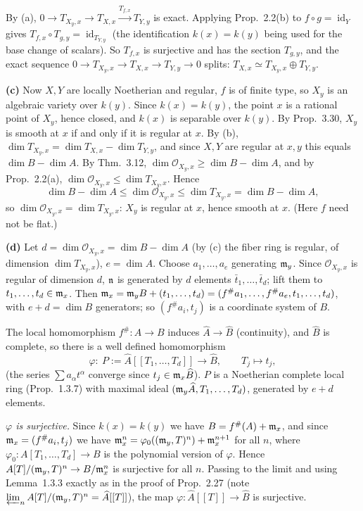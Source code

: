 \documentclass[11pt]{article}
\begin{document}
By (a), $0\to T_{X_y,x}\to T_{X,x}\xrightarrow{T_{f,x}}T_{Y,y}$ is exact. Applying Prop.~2.2(b) to $f\circ g=\operatorname{id}_Y$ gives $T_{f,x}\circ T_{g,y}=\operatorname{id}_{T_{Y,y}}$ (the identification $k(x)=k(y)$ being used for the base change of scalars). So $T_{f,x}$ is surjective and has the section $T_{g,y}$, and the exact sequence $0\to T_{X_y,x}\to T_{X,x}\to T_{Y,y}\to0$ splits: $T_{X,x}\simeq T_{X_y,x}\oplus T_{Y,y}$.

\textbf{(c)} Now $X,Y$ are locally Noetherian and regular, $f$ is of finite type, so $X_y$ is an algebraic variety over $k(y)$. Since $k(x)=k(y)$, the point $x$ is a rational point of $X_y$, hence closed, and $k(x)$ is separable over $k(y)$. By Prop.~3.30, $X_y$ is smooth at $x$ if and only if it is regular at $x$. By (b), $\dim T_{X_y,x}=\dim T_{X,x}-\dim T_{Y,y}$, and since $X,Y$ are regular at $x,y$ this equals $\dim B-\dim A$. By Thm.~3.12, $\dim\mathcal O_{X_y,x}\ge\dim B-\dim A$, and by Prop.~2.2(a), $\dim\mathcal O_{X_y,x}\le\dim T_{X_y,x}$. Hence
\[ \dim B-\dim A\le\dim\mathcal O_{X_y,x}\le\dim T_{X_y,x}=\dim B-\dim A, \]
so $\dim\mathcal O_{X_y,x}=\dim T_{X_y,x}$: $X_y$ is regular at $x$, hence smooth at $x$. (Here $f$ need not be flat.)

\textbf{(d)} Let $d=\dim\mathcal O_{X_y,x}=\dim B-\dim A$ (by (c) the fiber ring is regular, of dimension $\dim T_{X_y,x}$), $e=\dim A$. Choose $a_1,\dots,a_e$ generating $\mathfrak m_y$. Since $\mathcal O_{X_y,x}$ is regular of dimension $d$, $\mathfrak n$ is generated by $d$ elements $\bar t_1,\dots,\bar t_d$; lift them to $t_1,\dots,t_d\in\mathfrak m_x$. Then $\mathfrak m_x=\mathfrak m_yB+(t_1,\dots,t_d)=(f^\#a_1,\dots,f^\#a_e,t_1,\dots,t_d)$, with $e+d=\dim B$ generators; so $(f^\#a_i,t_j)$ is a coordinate system of $B$.

The local homomorphism $f^\#:A\to B$ induces $\widehat A\to\widehat B$ (continuity), and $\widehat B$ is complete, so there is a well defined homomorphism
\[ \varphi:\ P:=\widehat A[[T_1,\dots,T_d]]\longrightarrow\widehat B,\qquad T_j\mapsto t_j,\]
(the series $\sum a_\alpha t^\alpha$ converge since $t_j\in\mathfrak m_x\widehat B$). $P$ is a Noetherian complete local ring (Prop.~1.3.7) with maximal ideal $(\mathfrak m_y\widehat A,T_1,\dots,T_d)$, generated by $e+d$ elements.

\emph{$\varphi$ is surjective.} Since $k(x)=k(y)$ we have $B=f^\#(A)+\mathfrak m_x$, and since $\mathfrak m_x=(f^\#a_i,t_j)$ we have $\mathfrak m_x^n=\varphi_0((\mathfrak m_y,T)^n)+\mathfrak m_x^{n+1}$ for all $n$, where $\varphi_0:A[T_1,\dots,T_d]\to B$ is the polynomial version of $\varphi$. Hence $A[T]/(\mathfrak m_y,T)^n\to B/\mathfrak m_x^n$ is surjective for all $n$. Passing to the limit and using Lemma~1.3.3 exactly as in the proof of Prop.~2.27 (note $\varprojlim_nA[T]/(\mathfrak m_y,T)^n=\widehat A[[T]]$), the map $\varphi:\widehat A[[T]]\to\widehat B$ is surjective.
\end{document}
